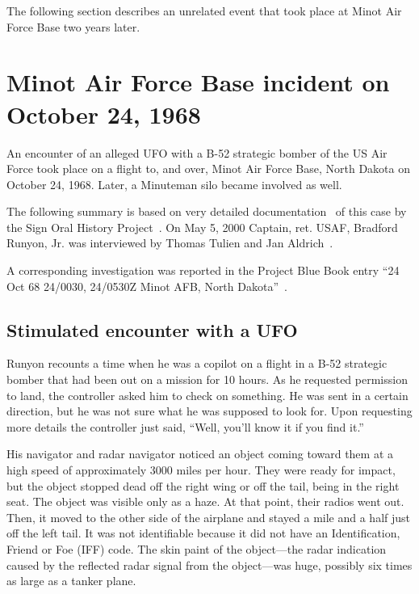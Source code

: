 The following section describes an unrelated event that took place at Minot Air Force Base two years later.


\section{Minot Air Force Base incident on October 24, 1968}

\label{2023-UFO-chapter-History--1953-2016-mi68}

An encounter of an alleged UFO with a B-52 strategic bomber of the US Air Force took place on a flight to, and over,
Minot Air Force Base, North Dakota on October 24, 1968. Later, a Minuteman silo became involved as well.

The following summary is based on very detailed documentation~\cite{minotb52ufo} of this case by the Sign Oral History Project~\cite{SOHPIndex}.
On May 5, 2000 Captain, ret. USAF, Bradford Runyon, Jr. was interviewed by Thomas Tulien and Jan Aldrich~\cite{MinotAFB1968}.

A corresponding investigation was reported in the Project Blue Book entry ``24 Oct 68 24/0030, 24/0530Z Minot AFB, North Dakota''~\cite{MinotAFBPBB1968,bluebook-directory-listing}.

\subsection{Stimulated encounter with a UFO}

Runyon recounts a time when he was a copilot on a flight in a B-52 strategic bomber
that had been out on a mission for 10 hours. As he requested permission to land, the controller asked him to check on something.
He was sent in a certain direction, but he was not sure what he was supposed to look for.
Upon requesting more details the controller just said, ``Well, you'll know it if you find it.''

His navigator and radar navigator noticed an object coming toward them at a high speed of approximately
3000 miles per hour. They were ready for impact, but the object stopped dead off the right wing or off the tail,
being in the right seat.
The object was visible only as a haze. At that point, their radios went out.
Then, it moved to the other side of the airplane and stayed a mile and a half just off the left tail.
It was not identifiable because it did not have an Identification, Friend or Foe (IFF) code.
The skin paint of the object---the radar indication caused by the reflected radar signal from the object---was huge,
possibly six times as large as a tanker plane.

